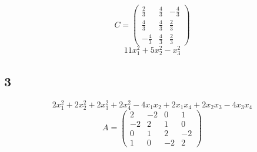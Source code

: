 $$ C =
\begin{pmatrix}
	\frac23 & \frac43 & -\frac43 \\
    \frac43 & \frac43 & \frac23 \\
    -\frac43 & \frac43 & \frac23
\end{pmatrix} $$
$$ 11x_1^2 + 5x_2^2 - x_3^2 $$

\subsection{3}

$$ 2x_1^2 + 2x_2^2 + 2x_3^2 + 2x_4^2 - 4x_1x_2 + 2x_1x_4 + 2x_2x_3 - 4x_3x_4 $$
$$ A =
\begin{pmatrix}
	2 & -2 & 0 & 1 \\
    -2 & 2 & 1 & 0 \\
    0 & 1 & 2 & -2 \\
    1 & 0 & -2 & 2
\end{pmatrix} $$
